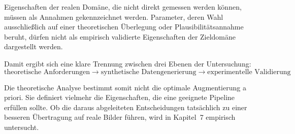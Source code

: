 Eigenschaften der realen Domäne, die nicht direkt gemessen werden können, müssen als Annahmen gekennzeichnet werden. Parameter, deren Wahl ausschließlich auf einer theoretischen Überlegung oder Plausibilitätsannahme beruht, dürfen nicht als empirisch validierte Eigenschaften der Zieldomäne dargestellt werden.

Damit ergibt sich eine klare Trennung zwischen drei Ebenen der Untersuchung:
\begin{equation}
\boxed{
\text{theoretische Anforderungen}
\rightarrow
\text{synthetische Datengenerierung}
\rightarrow
\text{experimentelle Validierung}
}
\tag{3.15}
\end{equation}

Die theoretische Analyse bestimmt somit nicht die optimale Augmentierung a priori. Sie definiert vielmehr die Eigenschaften, die eine geeignete Pipeline erfüllen sollte. Ob die daraus abgeleiteten Entscheidungen tatsächlich zu einer besseren Übertragung auf reale Bilder führen, wird in Kapitel~7 empirisch untersucht.

